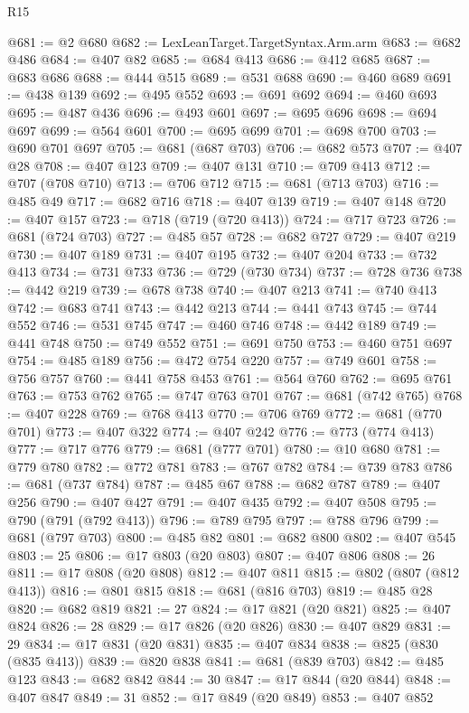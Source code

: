\begin{lexlean}{R15}
\begin{coremodule}
@681 := @2 @680
@682 := LexLeanTarget.TargetSyntax.Arm.arm
@683 := @682 @486
@684 := @407 @82
@685 := @684 @413
@686 := @412 @685
@687 := @683 @686
@688 := @444 @515
@689 := @531 @688
@690 := @460 @689
@691 := @438 @139
@692 := @495 @552
@693 := @691 @692
@694 := @460 @693
@695 := @487 @436
@696 := @493 @601
@697 := @695 @696
@698 := @694 @697
@699 := @564 @601
@700 := @695 @699
@701 := @698 @700
@703 := @690 @701 @697
@705 := @681 (@687 @703)
@706 := @682 @573
@707 := @407 @28
@708 := @407 @123
@709 := @407 @131
@710 := @709 @413
@712 := @707 (@708 @710)
@713 := @706 @712
@715 := @681 (@713 @703)
@716 := @485 @49
@717 := @682 @716
@718 := @407 @139
@719 := @407 @148
@720 := @407 @157
@723 := @718 (@719 (@720 @413))
@724 := @717 @723
@726 := @681 (@724 @703)
@727 := @485 @57
@728 := @682 @727
@729 := @407 @219
@730 := @407 @189
@731 := @407 @195
@732 := @407 @204
@733 := @732 @413
@734 := @731 @733
@736 := @729 (@730 @734)
@737 := @728 @736
@738 := @442 @219
@739 := @678 @738
@740 := @407 @213
@741 := @740 @413
@742 := @683 @741
@743 := @442 @213
@744 := @441 @743
@745 := @744 @552
@746 := @531 @745
@747 := @460 @746
@748 := @442 @189
@749 := @441 @748
@750 := @749 @552
@751 := @691 @750
@753 := @460 @751 @697
@754 := @485 @189
@756 := @472 @754 @220
@757 := @749 @601
@758 := @756 @757
@760 := @441 @758 @453
@761 := @564 @760
@762 := @695 @761
@763 := @753 @762
@765 := @747 @763 @701
@767 := @681 (@742 @765)
@768 := @407 @228
@769 := @768 @413
@770 := @706 @769
@772 := @681 (@770 @701)
@773 := @407 @322
@774 := @407 @242
@776 := @773 (@774 @413)
@777 := @717 @776
@779 := @681 (@777 @701)
@780 := @10 @680
@781 := @779 @780
@782 := @772 @781
@783 := @767 @782
@784 := @739 @783
@786 := @681 (@737 @784)
@787 := @485 @67
@788 := @682 @787
@789 := @407 @256
@790 := @407 @427
@791 := @407 @435
@792 := @407 @508
@795 := @790 (@791 (@792 @413))
@796 := @789 @795
@797 := @788 @796
@799 := @681 (@797 @703)
@800 := @485 @82
@801 := @682 @800
@802 := @407 @545
@803 := 25
@806 := @17 @803 (@20 @803)
@807 := @407 @806
@808 := 26
@811 := @17 @808 (@20 @808)
@812 := @407 @811
@815 := @802 (@807 (@812 @413))
@816 := @801 @815
@818 := @681 (@816 @703)
@819 := @485 @28
@820 := @682 @819
@821 := 27
@824 := @17 @821 (@20 @821)
@825 := @407 @824
@826 := 28
@829 := @17 @826 (@20 @826)
@830 := @407 @829
@831 := 29
@834 := @17 @831 (@20 @831)
@835 := @407 @834
@838 := @825 (@830 (@835 @413))
@839 := @820 @838
@841 := @681 (@839 @703)
@842 := @485 @123
@843 := @682 @842
@844 := 30
@847 := @17 @844 (@20 @844)
@848 := @407 @847
@849 := 31
@852 := @17 @849 (@20 @849)
@853 := @407 @852

\end{coremodule}
\end{lexlean}
